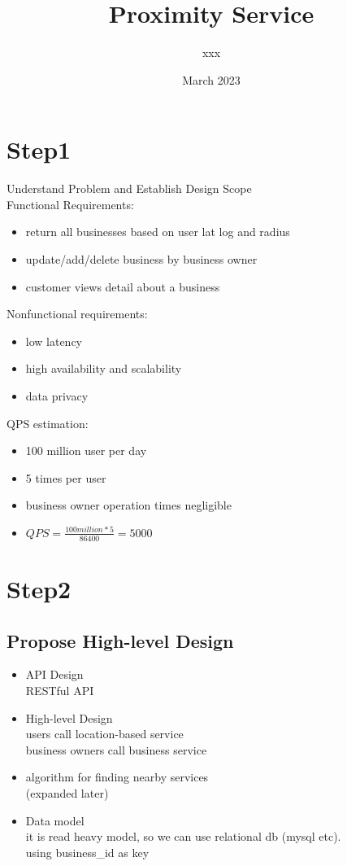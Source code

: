 \documentclass{article}
\title{Proximity Service}
\author{xxx}
\date{March 2023}
\begin{document}
\maketitle

\section{Step1}
Understand Problem and Establish Design Scope\\
Functional Requirements:\\
\begin{itemize}
    \item return all businesses based on user lat log and radius
    \item update/add/delete business by business owner
    \item customer views detail about a business
\end{itemize}
Nonfunctional requirements:\\
\begin{itemize}
    \item low latency
    \item high availability and scalability
    \item data privacy
\end{itemize}
QPS estimation:\\
\begin{itemize}
    \item 100 million user per day
    \item 5 times per user
    \item business owner operation times negligible
    \item $QPS = \frac{100million * 5}{86400} = 5000$
\end{itemize}

\section{Step2}
\subsection{Propose High-level Design}
\begin{itemize}
    \item API Design\\
    RESTful API
    \item High-level Design\\
    users call location-based service\\
    business owners call business service\\
    \item algorithm for finding nearby services\\
    (expanded later)\\
    \item Data model\\
    it is read heavy model, so we can use relational db (mysql etc).\\
    using business\_id as key\\
\end{itemize}
\end{document}
